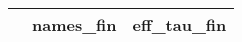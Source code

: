 \begin{table}[ht]
\centering
\begin{tabular}{rll}
  \hline
 & names\_fin & eff\_tau\_fin \\ 
  \hline
\hline
\end{tabular}
\end{table}
